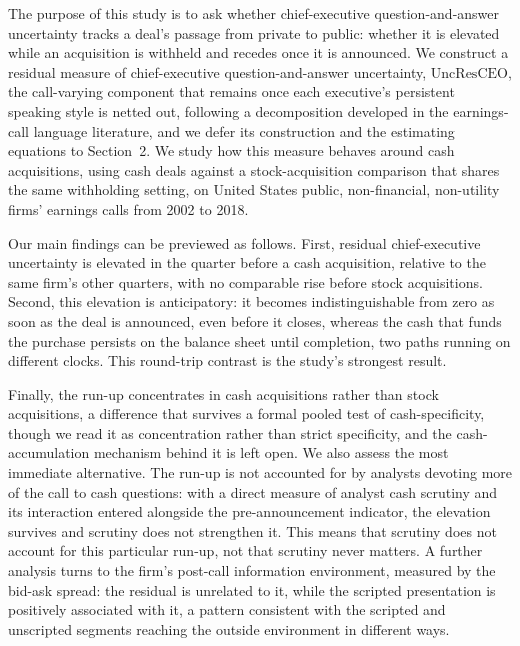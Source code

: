 The purpose of this study is to ask whether chief-executive question-and-answer uncertainty tracks a deal's passage from private to public: whether it is elevated while an acquisition is withheld and recedes once it is announced. We construct a residual measure of chief-executive question-and-answer uncertainty, $\mathrm{UncResCEO}$, the call-varying component that remains once each executive's persistent speaking style is netted out, following a decomposition developed in the earnings-call language literature, and we defer its construction and the estimating equations to Section~2. We study how this measure behaves around cash acquisitions, using cash deals against a stock-acquisition comparison that shares the same withholding setting, on United States public, non-financial, non-utility firms' earnings calls from 2002 to 2018.

Our main findings can be previewed as follows. First, residual chief-executive uncertainty is elevated in the quarter before a cash acquisition, relative to the same firm's other quarters, with no comparable rise before stock acquisitions. Second, this elevation is anticipatory: it becomes indistinguishable from zero as soon as the deal is announced, even before it closes, whereas the cash that funds the purchase persists on the balance sheet until completion, two paths running on different clocks. This round-trip contrast is the study's strongest result.

Finally, the run-up concentrates in cash acquisitions rather than stock acquisitions, a difference that survives a formal pooled test of cash-specificity, though we read it as concentration rather than strict specificity, and the cash-accumulation mechanism behind it is left open. We also assess the most immediate alternative. The run-up is not accounted for by analysts devoting more of the call to cash questions: with a direct measure of analyst cash scrutiny and its interaction entered alongside the pre-announcement indicator, the elevation survives and scrutiny does not strengthen it. This means that scrutiny does not account for this particular run-up, not that scrutiny never matters. A further analysis turns to the firm's post-call information environment, measured by the bid-ask spread: the residual is unrelated to it, while the scripted presentation is positively associated with it, a pattern consistent with the scripted and unscripted segments reaching the outside environment in different ways.

